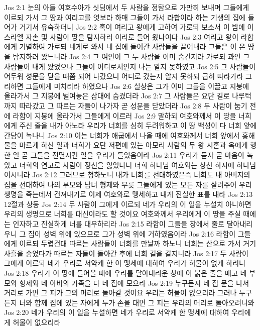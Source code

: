 Jos 2:1  눈의 아들 여호수아가 싯딤에서 두 사람을 정탐으로 가만히 보내며 그들에게 이르되 가서 그 땅과 여리고를 엿보라 하매 그들이 가서 라합이라 하는 기생의 집에 들어가 거기서 유숙하더니
Jos 2:2  혹이 여리고 왕에게 고하여 가로되 보소서 이 밤에 이스라엘 자손 몇 사람이 땅을 탐지하러 이리로 들어 왔나이다
Jos 2:3  여리고 왕이 라합에게 기별하여 가로되 네게로 와서 네 집에 들어간 사람들을 끌어내라 그들은 이 온 땅을 탐지하러 왔느니라
Jos 2:4  그 여인이 그 두 사람을 이미 숨긴지라 가로되 과연 그 사람들이 내게 왔었으나 그들이 어디로서인지 나는 알지 못하였고
Jos 2:5  그 사람들이 어두워 성문을 닫을 때쯤 되어 나갔으니 어디로 갔는지 알지 못하되 급히 따라가라 그리하면 그들에게 미치리라 하였으나
Jos 2:6  실상은 그가 이미 그들을 이끌고 지붕에 올라가서 그 지붕에 벌여놓은 삼대에 숨겼더라
Jos 2:7  그 사람들은 요단 길로 나루턱까지 따라갔고 그 따르는 자들이 나가자 곧 성문을 닫았더라
Jos 2:8  두 사람이 눕기 전에 라합이 지붕에 올라가서 그들에게 이르러
Jos 2:9  말하되 여호와께서 이 땅을 너희에게 주신 줄을 내가 아노라 우리가 너희를 심히 두려워하고 이 땅 백성이 다 너희 앞에 간담이 녹나니
Jos 2:10  이는 너희가 애굽에서 나올 때에 여호와께서 너희 앞에서 홍해 물을 마르게 하신 일과 너희가 요단 저편에 있는 아모리 사람의 두 왕 시혼과 옥에게 행한 일 곧 그들을 전멸시킨 일을 우리가 들었음이라
Jos 2:11  우리가 듣자 곧 마음이 녹았고 너희의 연고로 사람이 정신을 잃었나니 너희 하나님 여호와는 상천 하지에 하나님이시니라
Jos 2:12  그러므로 청하노니 내가 너희를 선대하였은즉 너희도 내 아버지의 집을 선대하여 나의 부모와 남녀 형제와 무릇 그들에게 있는 모든 자를 살려주어 우리 생명을 죽는데서 건져내기로 이제 여호와로 맹세하고 내게 진실한 표를 내라
Jos 2:13  12절과 상동
Jos 2:14  두 사람이 그에게 이르되 네가 우리의 이 일을 누설치 아니하면 우리의 생명으로 너희를 대신이라도 할 것이요 여호와께서 우리에게 이 땅을 주실 때에는 인자하고 진실하게 너를 대우하리라
Jos 2:15  라합이 그들을 창에서 줄로 달아내리우니 그 집이 성벽 위에 있으므로 그가 성벽 위에 거하였음이라
Jos 2:16  라합이 그들에게 이르되 두렵건대 따르는 사람들이 너희를 만날까 하노니 너희는 산으로 가서 거기 사흘을 숨었다가 따르는 자들이 돌아간 후에 너희 길을 갈지니라
Jos 2:17  두 사람이 그에게 이르되 네가 우리로 서약케 한 이 맹세에 대하여 우리가 허물이 없게 하리니
Jos 2:18  우리가 이 땅에 들어올 때에 우리를 달아내리운 창에 이 붉은 줄을 매고 네 부모와 형제와 네 아비의 가족을 다 네 집에 모으라
Jos 2:19  누구든지 네 집 문을 나서 거리로 가면 그 피가 그의 머리로 돌아갈 것이요 우리는 허물이 없으리라 그러나 누구든지 너와 함께 집에 있는 자에게 누가 손을 대면 그 피는 우리의 머리로 돌아오려니와
Jos 2:20  네가 우리의 이 일을 누설하면 네가 우리로 서약케 한 맹세에 대하여 우리에게 허물이 없으리라
